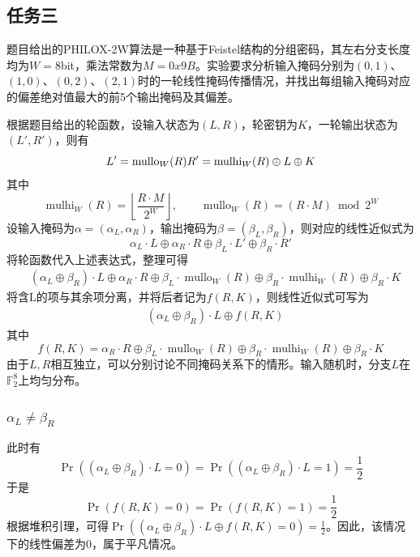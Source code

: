 \subsection{任务三}

题目给出的PHILOX-2W算法是一种基于Feistel结构的分组密码，其左右分支长度均为$W=8$bit，乘法常数为$M=0x9B$。实验要求分析输入掩码分别为$(0,1)$、$(1,0)$、$(0,2)$、$(2,1)$时的一轮线性掩码传播情况，并找出每组输入掩码对应的偏差绝对值最大的前5个输出掩码及其偏差。

根据题目给出的轮函数，设输入状态为$(L,R)$，轮密钥为$K$，一轮输出状态为$(L',R')$，则有
\[
L'=\operatorname{mullo}_W(R)
\\
R'=\operatorname{mulhi}_W(R)\oplus L\oplus K
\]
其中
\[
\operatorname{mulhi}_W(R)
=\left\lfloor\frac{R\cdot M}{2^W}\right\rfloor,
\qquad
\operatorname{mullo}_W(R)
=(R\cdot M)\bmod 2^W
\]
设输入掩码为$\alpha=(\alpha_L,\alpha_R)$，输出掩码为$\beta=(\beta_L,\beta_R)$，则对应的线性近似式为
\[
\alpha_L\cdot L\oplus\alpha_R\cdot R
\oplus\beta_L\cdot L'\oplus\beta_R\cdot R'
\]
将轮函数代入上述表达式，整理可得
\[
\begin{aligned}
&(\alpha_L\oplus\beta_R)\cdot L
\oplus\alpha_R\cdot R\oplus\beta_L\cdot\operatorname{mullo}_W(R)
\oplus\beta_R\cdot\operatorname{mulhi}_W(R)
\oplus\beta_R\cdot K
\end{aligned}
\]
将含L的项与其余项分离，并将后者记为$f(R,K)$，则线性近似式可写为
\[
\begin{aligned}
&(\alpha_L\oplus\beta_R)\cdot L \oplus f(R,K)
\end{aligned}
\]
其中
$$
f(R,K) = \alpha_R\cdot R\oplus\beta_L\cdot\operatorname{mullo}_W(R)
\oplus\beta_R\cdot\operatorname{mulhi}_W(R)
\oplus\beta_R\cdot K
$$
由于$L,R$相互独立，可以分别讨论不同掩码关系下的情形。输入随机时，分支$L$在$\mathbb{F}_2^8$上均匀分布。

\subsubsection{$\alpha_L\neq\beta_R$}

此时有
\[
\Pr((\alpha_L\oplus\beta_R)\cdot L = 0) = \Pr((\alpha_L\oplus\beta_R)\cdot L = 1) =\frac{1}{2}  
\]
于是
\[
\Pr(f(R,K) = 0) = \Pr(f(R,K) = 1) =\frac{1}{2}  
\]
根据堆积引理，可得\(\Pr((\alpha_L\oplus\beta_R)\cdot L \oplus f(R,K) = 0) = \frac{1}{2}\)。因此，该情况下的线性偏差为0，属于平凡情况。

